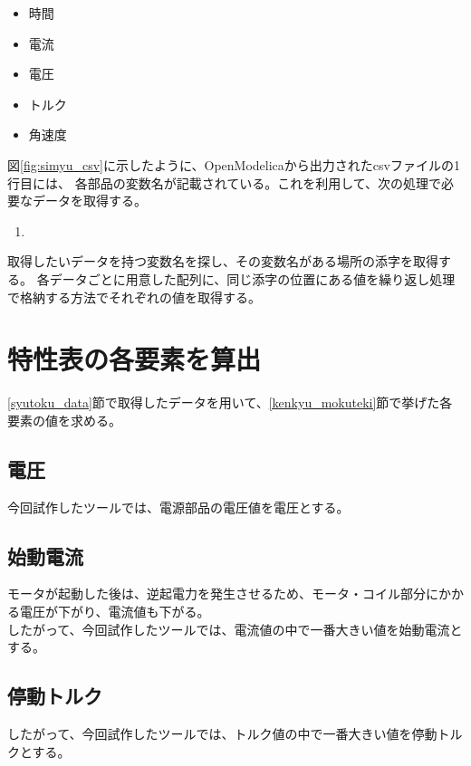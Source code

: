 \begin{itemize}
    \item 時間
    \item 電流
    \item 電圧
    \item トルク
    \item 角速度
\end{itemize}

図\ref{fig:simyu_csv}に示したように、OpenModelicaから出力されたcsvファイルの1行目には、
各部品の変数名が記載されている。これを利用して、次の処理で必要なデータを取得する。

\begin{enumerate}
    \item 
\end{enumerate}
取得したいデータを持つ変数名を探し、その変数名がある場所の添字を取得する。
各データごとに用意した配列に、同じ添字の位置にある値を繰り返し処理で格納する方法でそれぞれの値を取得する。

\section{特性表の各要素を算出}\label{keisan}
\ref{syutoku_data}節で取得したデータを用いて、\ref{kenkyu_mokuteki}節で挙げた各要素の値を求める。

\subsection{電圧}\label{sub:keisan_dennatu}
今回試作したツールでは、電源部品の電圧値を電圧とする。

\subsection{始動電流}\label{sub:keisan_sidouden}
モータが起動した後は、逆起電力を発生させるため、モータ・コイル部分にかかる電圧が下がり、電流値も下がる。\\
したがって、今回試作したツールでは、電流値の中で一番大きい値を始動電流とする。

\subsection{停動トルク}\label{sub:keisan_teidoutoruku}
したがって、今回試作したツールでは、トルク値の中で一番大きい値を停動トルクとする。


